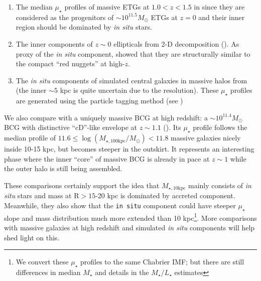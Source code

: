 \documentclass[a4paper,fleqn,usenatbib]{mnras}
\def\mstar{{$M_{\star}$}}
\def\minn{{$M_{\star,10\mathrm{kpc}}$}}
\def\logmtot{{$\log (M_{\star,100\mathrm{kpc}}/M_{\odot})$}}
\def\m2l{{$M_{\star}/L_{\star}$}}
\def\mden{{$\mu_{\star}$}}
\begin{document}
    \begin{enumerate}
        
        \item The median \mden{} profiles of massive ETGs at $1.0 < z < 1.5$ in
            \citealt{Patel2013} since they are considered as the progenitors of 
            ${\sim} 10^{11.5} M_{\odot}$ ETGs at $z=0$ and their inner region 
            should be dominated by \textit{in situ} stars. 
    
        \item The inner components of $z{\sim} 0$ ellipticals from 2-D 
            decomposition (\citealt{Huang2013a}).
            As proxy of the \textit{in situ} component, \citet{Huang2013b} showed 
            that they are structurally similar to the compact ``red nuggets'' at 
            high-$z$. 
        
        \item The \textit{in situ} components of simulated central galaxies in 
            massive halos from \citet{Cooper2013} (the inner ${\sim} 5$ kpc is 
            quite uncertain due to the resolution).  
            These \mden{} profiles are generated using the particle tagging 
            method (see \citealt{Cooper2010})
    
    \end{enumerate}

    We also compare with a uniquely massive BCG at high redshift: 
    a ${\sim} 10^{11.4} M_{\odot}$ BCG with distinctive ``cD''-like envelope at 
    $z{\sim} 1.1$ (\citealt{Liu2013}).  
    Its \mden{} profile follows the median profile of $11.6\leq$\logmtot{}$<11.8$ 
    massive galaxies nicely inside 10-15 kpc, but becomes steeper in the outskirt.
    It represents an interesting phase where the inner ``core'' of massive BCG is 
    already in pace at $z{\sim} 1$ while the outer halo is still being assembled. 

    These comparisons certainly support the idea that \minn{} mainly consists of 
    \textit{in situ} stars and mass at $\mathrm{R} > 15$-20 kpc is dominated by accreted 
    component.     
    Meanwhile, they also show that the \texttt{in situ} component 
    could have steeper \mden{} slope and mass distribution much more extended than 
    10 kpc\footnote{We convert these \mden{} profiles to the same 
    Chabrier IMF; but there are still differences in median \mstar{} and 
    details in the \m2l{} estimates}. 
    More comparisons with massive galaxies at high redshift and simulated 
    \textit{in situ} components will help shed light on this.     
\end{document}
